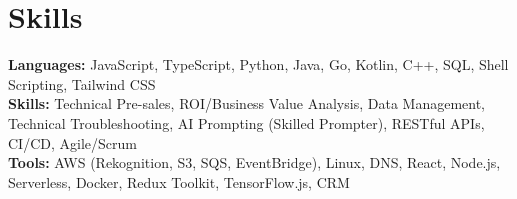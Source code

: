 \documentclass[11pt]{article}       %
\begin{document}
\section*{Skills}
\textbf{Languages:} JavaScript, TypeScript, Python, Java, Go, Kotlin, C++, SQL, Shell Scripting, Tailwind CSS\\
\textbf{Skills:} Technical Pre-sales, ROI/Business Value Analysis, Data Management, Technical Troubleshooting, AI Prompting (Skilled Prompter), RESTful APIs, CI/CD, Agile/Scrum\\
\textbf{Tools:} AWS (Rekognition, S3, SQS, EventBridge), Linux, DNS, React, Node.js, Serverless, Docker, Redux Toolkit, TensorFlow.js, CRM\\

\vspace{-6.5pt}
\end{document}
